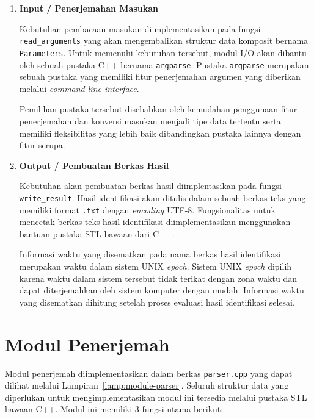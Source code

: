 \begin{enumerate}
    \item \textbf{Input / Penerjemahan Masukan}
    
    Kebutuhan pembacaan masukan diimplementasikan pada fungsi \texttt{read\_arguments} yang akan mengembalikan struktur data komposit bernama \texttt{Parameters}. Untuk memenuhi kebutuhan tersebut, modul I/O akan dibantu oleh sebuah pustaka C++ bernama \texttt{argparse}. Pustaka \texttt{argparse} merupakan sebuah pustaka yang memiliki fitur penerjemahan argumen yang diberikan melalui \textit{command line interface}.
    
    Pemilihan pustaka tersebut disebabkan oleh kemudahan penggunaan fitur penerjemahan dan konversi masukan menjadi tipe data tertentu serta memiliki fleksibilitas yang lebih baik dibandingkan pustaka lainnya dengan fitur serupa. 
    
    \item \textbf{Output / Pembuatan Berkas Hasil}
    
    Kebutuhan akan pembuatan berkas hasil diimplentasikan pada fungsi \texttt{write\_result}. Hasil identifikasi akan ditulis dalam sebuah berkas teks yang memiliki format \texttt{.txt} dengan \textit{encoding} UTF-8. Fungsionalitas untuk mencetak berkas teks hasil identifikasi diimplementasikan menggunakan bantuan pustaka STL bawaan dari C++.
    
    Informasi waktu yang disematkan pada nama berkas hasil identifikasi merupakan waktu dalam sistem UNIX \textit{epoch}. Sistem UNIX \textit{epoch} dipilih karena waktu dalam sistem tersebut tidak terikat dengan zona waktu dan dapat diterjemahkan oleh sistem komputer dengan mudah. Informasi waktu yang disematkan dihitung setelah proses evaluasi hasil identifikasi selesai.
\end{enumerate}

\section{Modul Penerjemah}
\label{sec:impl-parser}

Modul penerjemah diimplementasikan dalam berkas \texttt{parser.cpp} yang dapat dilihat melalui Lampiran~\ref{lamp:module-parser}. Seluruh struktur data yang diperlukan untuk mengimplementasikan modul ini tersedia melalui pustaka STL bawaan C++. Modul ini memiliki 3 fungsi utama berikut:

